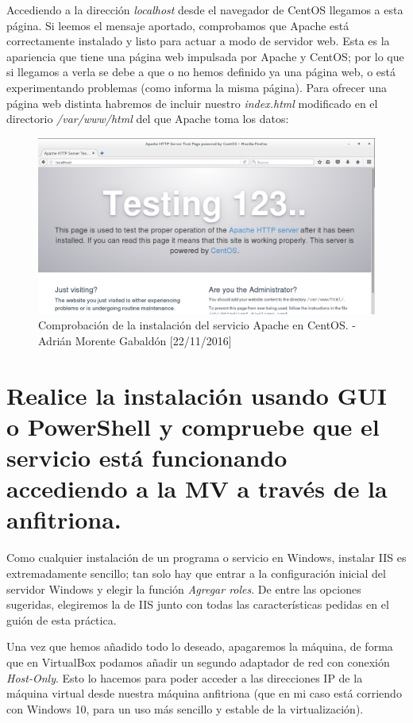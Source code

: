 Accediendo a la dirección \emph{localhost} desde el navegador de CentOS llegamos a esta página. Si leemos el mensaje aportado, comprobamos que Apache está correctamente instalado y listo para actuar a modo de servidor web. Esta es la apariencia que tiene una página web impulsada por Apache y CentOS; por lo que si llegamos a verla se debe a que o no hemos definido ya una página web, o está experimentando problemas (como informa la misma página). Para ofrecer una página web distinta habremos de incluir nuestro \emph{index.html} modificado en el directorio \emph{/var/www/html} del que Apache toma los datos:
\begin{figure}[H]
	\centering
	\includegraphics[scale=0.45]{apache-centos}
	\caption{Comprobación de la instalación del servicio Apache en CentOS. - Adrián Morente Gabaldón [22/11/2016]}
	\label{fig:figura9}
\end{figure}


\section{Realice la instalación usando GUI o PowerShell y compruebe que el servicio está funcionando accediendo a la MV a través de la anfitriona.}
Como cualquier instalación de un programa o servicio en Windows, instalar IIS es extremadamente sencillo; tan solo hay que entrar a la configuración inicial del servidor Windows y elegir la función \emph{Agregar roles}. De entre las opciones sugeridas, elegiremos la de IIS junto con todas las características pedidas en el guión de esta práctica.

Una vez que hemos añadido todo lo deseado, apagaremos la máquina, de forma que en VirtualBox podamos añadir un segundo adaptador de red con conexión \emph{Host-Only}. Esto lo hacemos para poder acceder a las direcciones IP de la máquina virtual desde nuestra máquina anfitriona (que en mi caso está corriendo con Windows 10, para un uso más sencillo y estable de la virtualización).

